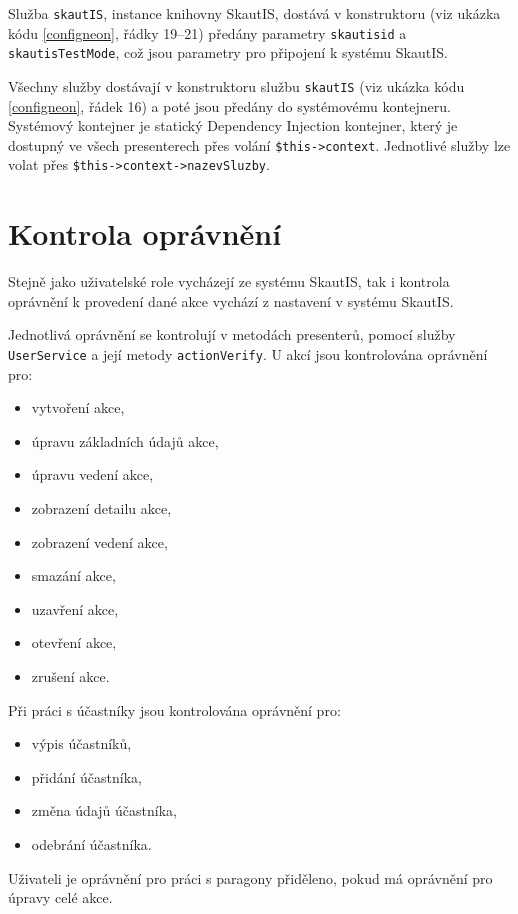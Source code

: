 \documentclass[thesis=B,czech]{FITthesis}[2011/06/14]
\begin{document}
Služba \texttt{skautIS}, instance knihovny SkautIS, dostává v konstruktoru (viz ukázka kódu \ref{configneon}, řádky 19--21) předány parametry \texttt{skautisid} a \texttt{skautisTestMode}, což jsou parametry pro připojení k systému SkautIS. 

Všechny služby dostávají v konstruktoru službu \texttt{skautIS} (viz ukázka kódu \ref{configneon}, řádek 16) a poté jsou předány do systémovému kontejneru. Systémový kontejner je statický Dependency Injection\cite{di} kontejner, který je dostupný ve všech presenterech přes volání \texttt{\$this->context}. Jednotlivé služby lze volat přes \texttt{\$this->context->nazevSluzby}.


\section{Kontrola oprávnění}
Stejně jako uživatelské role vycházejí ze systému SkautIS, tak i kontrola oprávnění k provedení dané akce vychází z nastavení v systému SkautIS.

Jednotlivá oprávnění se kontrolují v metodách presenterů, pomocí služby \texttt{UserService} a její metody \texttt{actionVerify}. U akcí jsou kontrolována oprávnění pro:

\begin{itemize}
	\item vytvoření akce,
	\item úpravu základních údajů akce,
	\item úpravu vedení akce,
	\item zobrazení detailu akce,
	\item zobrazení vedení akce,
	\item smazání akce,
	\item uzavření akce,
	\item otevření akce,
	\item zrušení akce.
\end{itemize}

Při práci s účastníky jsou kontrolována oprávnění pro:
\begin{itemize}
	\item výpis účastníků,
	\item přidání účastníka,
	\item změna údajů účastníka,
	\item odebrání účastníka.
	\end{itemize}

Uživateli je oprávnění pro práci s paragony přiděleno, pokud má oprávnění pro úpravy celé akce. 	
	
\end{document}
